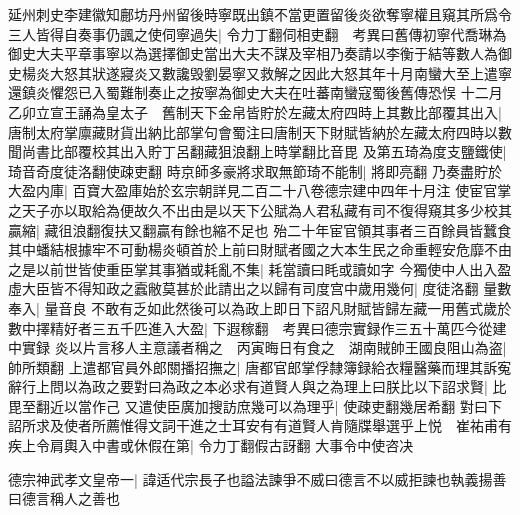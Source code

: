 延州刺史李建徽知鄜坊丹州留後時寧既出鎮不當更置留後炎欲奪寧權且窺其所爲令三人皆得自奏事仍諷之使伺寧過失|{
	令力丁翻伺相吏翻　考異曰舊傳初寧代喬琳為御史大夫平章事寧以為選擇御史當出大夫不謀及宰相乃奏請以李衡于結等數人為御史楊炎大怒其狀遂寢炎又數讒毁劉晏寧又救解之因此大怒其年十月南蠻大至上遣寧還鎮炎懼怨已入蜀難制奏止之按寧為御史大夫在吐蕃南蠻寇蜀後舊傳恐悮}
十二月乙卯立宣王誦為皇太子　舊制天下金帛皆貯於左藏太府四時上其數比部覆其出入|{
	唐制太府掌廪藏財貨出納比部掌句會蜀注曰唐制天下財賦皆納於左藏太府四時以數聞尚書比部覆校其出入貯丁呂翻藏狙浪翻上時掌翻比音毘}
及第五琦為度支鹽鐵使|{
	琦音奇度徒洛翻使疎吏翻}
時京師多豪將求取無節琦不能制|{
	將即亮翻}
乃奏盡貯於大盈内庫|{
	百寶大盈庫始於玄宗朝詳見二百二十八卷德宗建中四年十月注}
使宦官掌之天子亦以取給為便故久不出由是以天下公賦為人君私藏有司不復得窺其多少校其贏縮|{
	藏徂浪翻復扶又翻贏有餘也縮不足也}
殆二十年宦官領其事者三百餘員皆蠶食其中蟠結根據牢不可動楊炎頓首於上前曰財賦者國之大本生民之命重輕安危靡不由之是以前世皆使重臣掌其事猶或耗亂不集|{
	耗當讀曰眊或讀如字}
今獨使中人出入盈虛大臣皆不得知政之蠧敝莫甚於此請出之以歸有司度宫中歲用幾何|{
	度徒洛翻}
量數奉入|{
	量音良}
不敢有乏如此然後可以為政上即日下詔凡財賦皆歸左藏一用舊式歲於數中擇精好者三五千匹進入大盈|{
	下遐稼翻　考異曰德宗實録作三五十萬匹今從建中實録}
炎以片言移人主意議者稱之　丙寅晦日有食之　湖南賊帥王國良阻山為盗|{
	帥所類翻}
上遣都官員外郎關播招撫之|{
	唐都官郎掌俘隸簿録給衣糧醫藥而理其訴寃}
辭行上問以為政之要對曰為政之本必求有道賢人與之為理上曰朕比以下詔求賢|{
	比毘至翻近以當作己}
又遣使臣廣加搜訪庶幾可以為理乎|{
	使疎吏翻幾居希翻}
對曰下詔所求及使者所薦惟得文詞干進之士耳安有有道賢人肯隨牒舉選乎上悦　崔祐甫有疾上令肩輿入中書或休假在第|{
	令力丁翻假古訝翻}
大事令中使咨决

德宗神武孝文皇帝一|{
	諱适代宗長子也謚法諫爭不威曰德言不以威拒諫也執義揚善曰德言稱人之善也}


